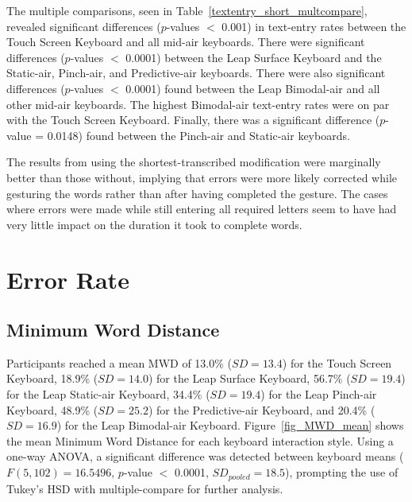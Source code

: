 The multiple comparisons, seen in Table~\ref{textentry_short_multcompare}, revealed significant differences ($p$-values $<$ 0.001) in text-entry rates between the Touch Screen Keyboard and all mid-air keyboards. There were significant differences ($p$-values $<$ 0.0001) between the Leap Surface Keyboard and the Static-air, Pinch-air, and Predictive-air keyboards. There were also significant differences ($p$-values $<$ 0.0001) found between the Leap Bimodal-air and all other mid-air keyboards. The highest Bimodal-air text-entry rates were on par with the Touch Screen Keyboard. Finally, there was a significant difference ($p$-value = 0.0148) found between the Pinch-air and Static-air keyboards.

The results from using the shortest-transcribed modification were marginally better than those without, implying that errors were more likely corrected while gesturing the words rather than after having completed the gesture. The cases where errors were made while still entering all required letters seem to have had very little impact on the duration it took to complete words.

\section{Error Rate}

\subsection{Minimum Word Distance}
Participants reached a mean MWD of 13.0\% ($SD = 13.4$) for the Touch Screen Keyboard, 18.9\% ($SD = 14.0$) for the Leap Surface Keyboard, 56.7\% ($SD = 19.4$) for the Leap Static-air Keyboard, 34.4\% ($SD = 19.4$) for the Leap Pinch-air Keyboard, 48.9\% ($SD = 25.2$) for the Predictive-air Keyboard, and 20.4\% ($SD = 16.9$) for the Leap Bimodal-air Keyboard. Figure~\ref{fig_MWD_mean} shows the mean Minimum Word Distance for each keyboard interaction style. Using a one-way ANOVA, a significant difference was detected between keyboard means ($F(5, 102) = 16.5496$, $p$-value $<$ 0.0001, $SD_{pooled} = 18.5$), prompting the use of Tukey's HSD with multiple-compare for further analysis.

